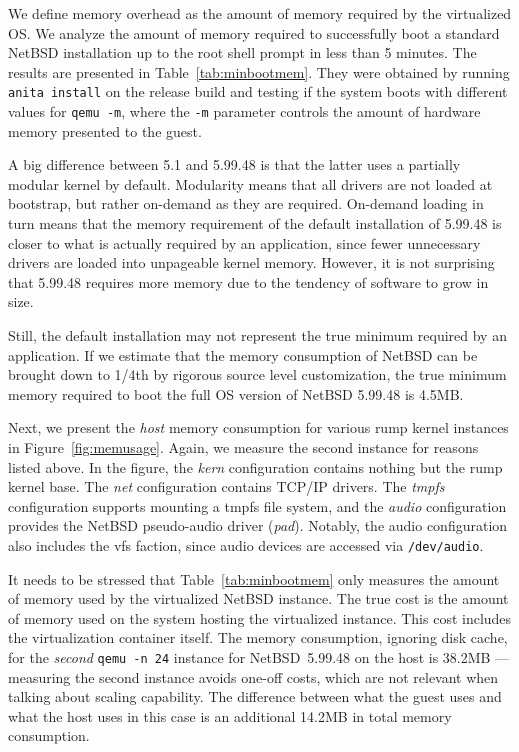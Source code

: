We define memory overhead as the amount of memory required by the
virtualized OS.  We analyze the amount of memory required
to successfully boot a standard NetBSD installation up to the root
shell prompt in less than 5 minutes.  The results are
presented in Table~\ref{tab:minbootmem}.  They were obtained by
running \texttt{anita install} on the release build and testing if
the system boots with different values for \texttt{qemu -m}, where
the \texttt{-m} parameter controls the amount of hardware memory
presented to the guest.

A big difference between 5.1 and 5.99.48 is that the latter uses
a partially modular kernel by default.  Modularity means that all drivers
are not loaded at bootstrap, but rather on-demand as they are
required.  On-demand loading in turn means that the memory requirement of the
default installation of 5.99.48 is closer to what is actually
required by an application, since fewer unnecessary drivers
are loaded into unpageable kernel memory.  However, it is not
surprising that 5.99.48 requires more memory due to the tendency
of software to grow in size.

Still, the default installation may not represent the true minimum
required by an application.  If we estimate that the memory
consumption of NetBSD can be brought down to 1/4th by rigorous source level customization,
the true minimum memory required to boot the full OS version of
NetBSD 5.99.48 is 4.5MB.

Next, we present the \textit{host} memory consumption for various
rump kernel instances in Figure~\ref{fig:memusage}.  Again, we
measure the second instance for reasons listed above.  In the
figure, the \textit{kern} configuration contains nothing but the
rump kernel base.  The \textit{net} configuration contains TCP/IP
drivers.  The \textit{tmpfs} configuration supports mounting a tmpfs
file system, and the \textit{audio} configuration provides the
NetBSD pseudo-audio driver (\textit{pad}).  Notably, the audio
configuration also includes the vfs faction, since audio devices
are accessed via \texttt{/dev/audio}.

It needs to be stressed that Table~\ref{tab:minbootmem}
only measures the amount of memory used by the virtualized NetBSD
instance.  The true cost is the amount of memory used on the system
hosting the virtualized instance.  This cost includes the virtualization
container itself.  The memory consumption, ignoring disk cache,
for the \textit{second} \texttt{qemu~-n~24} instance for NetBSD~5.99.48
on the host is 38.2MB --- measuring the second instance avoids
one-off costs, which are not relevant when talking about scaling
capability.  The difference between what the guest uses and what
the host uses in this case is an additional 14.2MB in total memory
consumption.

